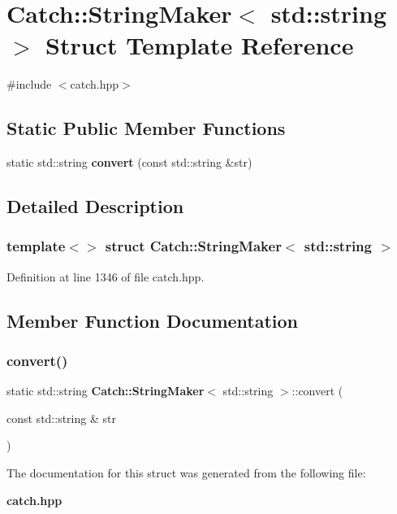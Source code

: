 \section{Catch\+::String\+Maker$<$ std\+::string $>$ Struct Template Reference}
\label{struct_catch_1_1_string_maker_3_01std_1_1string_01_4}


{\ttfamily \#include $<$catch.\+hpp$>$}

\subsection*{Static Public Member Functions}
\begin{DoxyCompactItemize}
\item 
static std\+::string \textbf{ convert} (const std\+::string \&str)
\end{DoxyCompactItemize}


\subsection{Detailed Description}
\subsubsection*{template$<$$>$\newline
struct Catch\+::\+String\+Maker$<$ std\+::string $>$}



Definition at line 1346 of file catch.\+hpp.



\subsection{Member Function Documentation}
\mbox{\label{struct_catch_1_1_string_maker_3_01std_1_1string_01_4_ae065b2ecc5c1a6c4409cf06d604bd66d}} 
\subsubsection{convert()}
{\footnotesize\ttfamily static std\+::string \textbf{ Catch\+::\+String\+Maker}$<$ std\+::string $>$\+::convert (\begin{DoxyParamCaption}\item[{const std\+::string \&}]{str }\end{DoxyParamCaption})\hspace{0.3cm}{\ttfamily [static]}}



The documentation for this struct was generated from the following file\+:\begin{DoxyCompactItemize}
\item 
\textbf{ catch.\+hpp}\end{DoxyCompactItemize}
